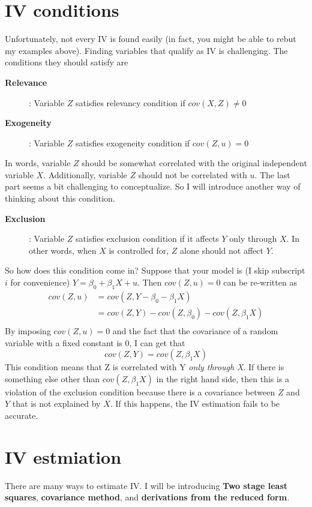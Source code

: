 \section{IV conditions}
Unfortunately, not every IV is found easily (in fact, you might be able to rebut my examples above). Finding variables that qualify as IV is challenging. The conditions they should satisfy are
\begin{description}
\item[\textbf{Relevance}]: Variable $Z$ satisfies relevancy condition if $cov(X,Z)\neq0$
\item[\textbf{Exogeneity}]: Variable $Z$ satisfies exogeneity condition if $cov(Z,u)=0$
\end{description}
In words, variable $Z$ should be somewhat correlated with the original independent variable $X$. Additionally, variable $Z$ should not be correlated with $u$. The last part seems a bit challenging to conceptualize. So I will introduce another way of thinking about this condition.
\begin{description}
\item[\textbf{Exclusion}]: Variable $Z$ satisfies exclusion condition if it affects $Y$ only through $X$. In other words, when $X$ is controlled for, $Z$ alone should not affect $Y$.
\end{description}
So how does this condition come in? Suppose that your model is (I skip subscript $i$ for convenience) $Y=\beta_0+\beta_1X+u$. Then $cov(Z,u)=0$ can be re-written as
\[
\begin{aligned}
cov(Z,u)&=cov(Z,Y-\beta_0-\beta_1X)\\
&=cov(Z,Y)-cov(Z,\beta_0)-cov(Z,\beta_1X)\\
\end{aligned}
\]
By imposing $cov(Z,u)=0$ and the fact that the covariance of a random variable with a fixed constant is 0, I can get that
\[
cov(Z,Y)=cov(Z,\beta_1X)
\]
This condition means that Z is correlated with Y \textit{only through X}. If there is something else other than $cov(Z,\beta_1X)$ in the right hand side, then this is a violation of the exclusion condition because there is a covariance between $Z$ and $Y$ that is not explained by $X$. If this happens, the IV estimation fails to be accurate. 

\section{IV estmiation}
There are many ways to estimate IV. I will be introducing \textbf{Two stage least squares}, \textbf{covariance method}, and \textbf{derivations from the reduced form}. 


